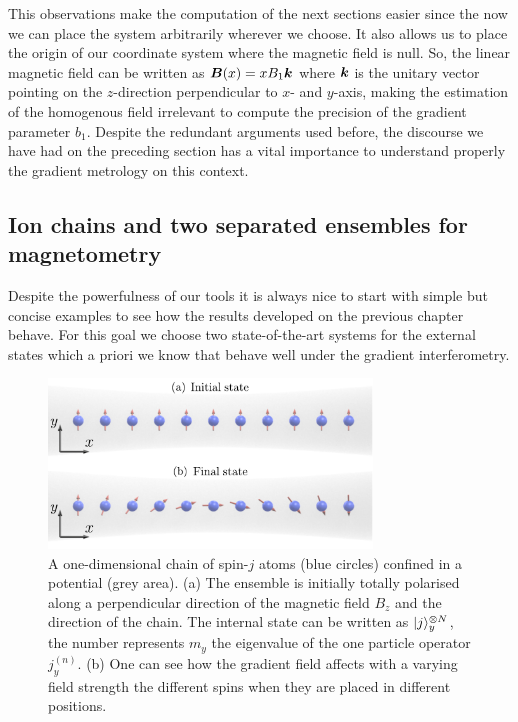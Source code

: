 This observations make the computation of the next sections easier since the now we can place the system arbitrarily wherever we choose.
It also allows us to place the origin of our coordinate system where the magnetic field is null.
So, the linear magnetic field can be written as $\boldsymbol{B}(x)= xB_1\boldsymbol{k}$ where $\boldsymbol{k}$ is the unitary vector pointing on the $z$-direction perpendicular to $x$- and $y$-axis, making the estimation of the homogenous field irrelevant to compute the precision of the gradient parameter $b_1$.
Despite the redundant arguments used before, the discourse we have had on the preceding section has a vital importance to understand properly the gradient metrology on this context.


\subsection{Ion chains and two separated ensembles for magnetometry}
\label{sec:twin cloud systems}

Despite the powerfulness of our tools it is always nice to start with simple but concise examples to see how the results developed on the previous chapter behave.
For this goal we choose two state-of-the-art systems for the external states which a priori we know that behave well under the gradient interferometry.

\begin{figure}[htp]
\begin{center}
\includegraphics[width=244pt]{img/GM_tp_chain_rotating.pdf}
\caption[1-D chain of atoms gradient evolution secuence]{A one-dimensional chain of spin-$j$ atoms (blue
circles) confined in a potential (grey area).
(a) The ensemble is initially totally polarised along a
perpendicular direction of the magnetic field $B_z$ and the direction of the chain.
The internal state can be written as $\vert j \rangle_{y}^{\otimes N}$, the number represents $m_y$ the eigenvalue of the one particle operator $j_y^{(n)}$.
(b) One can see how the gradient field affects with a varying field strength the different spins when they are placed in different positions. }
\label{fig:ionchain-evolution}
\end{center}
\end{figure}

